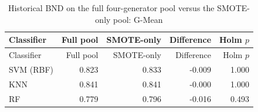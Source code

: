\begingroup\small\setlength{\tabcolsep}{3pt}
\begin{longtable}{@{}lrrrr@{}}
\caption{Historical BND on the full four-generator pool versus the SMOTE-only pool: G-Mean}\label{tab:7}\\
\toprule
Classifier & Full pool & SMOTE-only & Difference & Holm $p$ \\
\midrule
\endfirsthead
\toprule
Classifier & Full pool & SMOTE-only & Difference & Holm $p$ \\
\midrule
\endhead
\bottomrule
\endlastfoot
SVM (RBF) & 0.823 & 0.833 & -0.009 & 1.000 \\
KNN & 0.841 & 0.841 & -0.000 & 1.000 \\
RF & 0.779 & 0.796 & -0.016 & 0.493 \\
\end{longtable}
\endgroup
